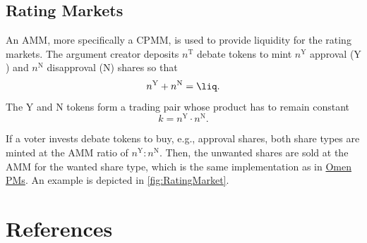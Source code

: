 \documentclass[%
aip,
amsmath,amssymb,
reprint,%
unsortedaddress,
nofootinbib
]{revtex4-2}
\newcommand{\T}{\text{T}}
\newcommand{\Y}{\text{Y}}
\newcommand{\N}{\text{N}}
\begin{document}
\subsection*{Rating Markets}\label{sec:RatingMarkets}
An \ac{AMM}, more specifically a \ac{CPMM}, is used to provide liquidity for the rating markets.
The argument creator deposits $n^\T$ debate tokens 
to mint 
$n^\Y$ approval ($\Y$) and 
$n^\N$ disapproval ($\N$) shares
so that
\begin{equation}
	n^\Y+n^\N = \liq.
\end{equation}
The $\Y$ and $\N$ tokens form a trading pair
whose product has to remain constant
\begin{equation}
	k = n^\Y\cdot n^\N.
\end{equation}

If a voter invests debate tokens to buy, e.g., approval shares,
both share types are minted at the  \ac{AMM} ratio of $n^\Y: n^\N$.
Then, the unwanted shares are sold at the \ac{AMM} for the wanted share type, 
which is the same implementation as in 
\href{https://omen.eth.link/}{Omen \acp{PM}}\cite{Omen2020}.
An example is depicted in \cref{fig:RatingMarket}.
\\

\section*{References}
%

\end{document}
